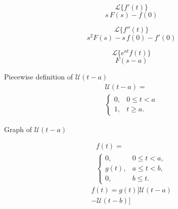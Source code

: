\documentclass[grid, poker_landscape]{flashcards}
\begin{document}
  \begin{flashcard}{ \[ \mathcal{L} \{ f'(t) \} \] }
    \[
      s \, F(s)-f(0)
    \]
  \end{flashcard}

  \begin{flashcard}{ \[ \mathcal{L} \{ f''(t) \} \] }
    \[
      s^{2} F(s) -s\,f(0) - f'(0)
    \]
  \end{flashcard}



  \begin{flashcard}{ \[ \mathcal{L} \{ e^{at} f(t) \} \] }
    \[
      F(s-a)
    \]
  \end{flashcard}

  \begin{flashcard}{Piecewise definition of $ \mathscr{U}(t - a) $}
    \[
        \begin{multlined}
            \mathscr{U}(t - a) = \\
            \begin{cases}
                0, & 0 \leq t < a \\
                1, & t \geq a.
            \end{cases}
        \end{multlined}
    \]
  \end{flashcard}

  \begin{flashcard}{Graph of $ \mathscr{U}(t - a) $}
  \end{flashcard}

  \begin{flashcard}{
    \[
        \begin{multlined} 
            f(t) = \\
            \begin{cases}
                  0,    & 0 \leq t < a, \\
                  g(t), & a \leq t < b, \\
                  0,    & b \leq t.
            \end{cases}
        \end{multlined}
    \]
    }
    \[
        \begin{multlined}
            f(t) = g(t) \Big [ \mathscr{U}(t-a) \\
              - \mathscr{U}(t-b) \Big ]
        \end{multlined}
    \]
  \end{flashcard}
\end{document}
